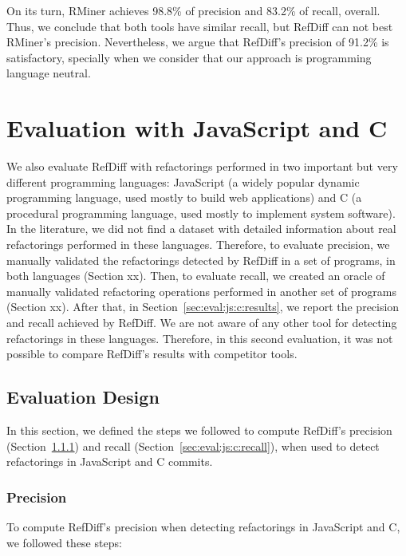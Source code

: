 On its turn, RMiner achieves 98.8\% of precision and 83.2\% of recall, overall. Thus, we conclude that both tools have similar recall, but RefDiff can not best RMiner's precision.
Nevertheless, we argue that RefDiff's precision of 91.2\% is satisfactory, specially when we consider that our approach is programming language neutral.


\section{Evaluation with JavaScript and C}
\label{sec:eval:js:c:reults}

We also evaluate RefDiff with refactorings performed in two important but very different programming languages: JavaScript (a widely popular dynamic programming language, used mostly to build web applications) and C (a procedural programming language, used mostly to implement system software).
In the literature, we did not find a dataset with detailed information about real refactorings performed in these languages. Therefore, to evaluate precision, we manually validated the refactorings detected by RefDiff in a set of programs, in both languages (Section xx). Then, to evaluate recall, we created an oracle of manually validated refactoring operations performed in another set of programs (Section xx).  After that, in Section~\ref{sec:eval:js:c:results}, we report the precision and recall achieved by RefDiff.  We are not aware of any other tool for detecting refactorings in these languages. Therefore, in this second evaluation, it was not possible to compare RefDiff's results with competitor tools.

\subsection{Evaluation Design}
\label{sec:eval:js:c:design}

In this section, we defined the steps we followed to compute RefDiff's precision (Section~\ref{sec:eval:js:c:precision})
and recall (Section~\ref{sec:eval:js:c:recall}), when used to detect refactorings in JavaScript and C commits.

\subsubsection{Precision}
\label{sec:eval:js:c:precision}


To compute RefDiff's precision when detecting refactorings in JavaScript and C, we followed these steps:

